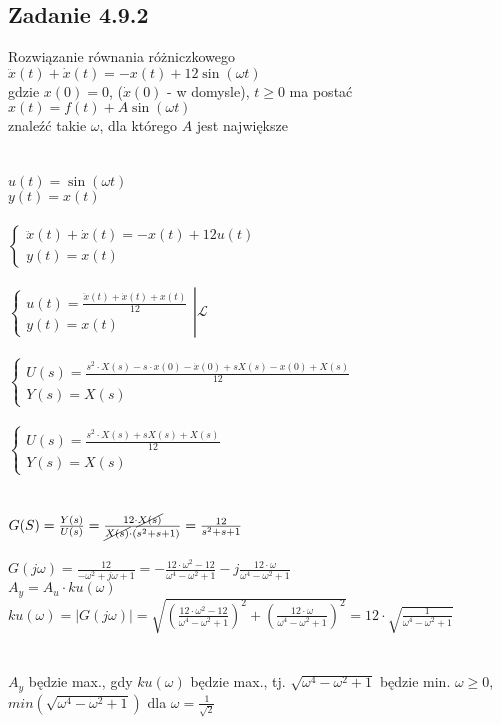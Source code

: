 \pagebreak
\subsection*{Zadanie 4.9.2} {\color{darkgray}
	Rozwiązanie równania różniczkowego\\
	$\ddot{x}(t)+\dot{x}(t)=-x(t)+12\sin({\omega t})$\\
	gdzie $x(0)=0$, ($\dot{x}(0)$ - w domysle), $t \geq 0$ ma postać\\
	$x(t)=f(t)+A\sin({\omega t})$\\
	znaleźć takie $\omega$, dla którego $A$ jest największe\\
}\lineh
\\\\
$u(t)=\sin({\omega t})$\\
$y(t)=x(t)$\\\\
$\begin{cases} \ddot{x}(t)+\dot{x}(t)=-x(t)+12u(t)\\y(t)=x(t)\end{cases}$\\\\
$\left.\begin{cases} u(t)=\frac{\ddot{x}(t)+\dot{x}(t)+x(t)}{12}\\y(t)=x(t)\end{cases}\right|\mathscr{L}$\\\\
$\begin{cases} U(s)=\frac{s^2\cdot X(s)-s\cdot x(0)-\dot{x}(0)+sX(s)-x(0)+X(s)}{12}\\Y(s)=X(s)\end{cases}$\\\\
$\begin{cases} U(s)=\frac{s^2\cdot X(s)+sX(s)+X(s)}{12}\\Y(s)=X(s)\end{cases}$\\\\\\
$G(S)=\frac{Y(s)}{U(s)}=\frac{12\cdot \cancel{X(s)}}{\cancel{X(s)}\cdot (s^2+s+1)}=\frac{12}{s^2+s+1}$\\\\
$G(j\omega)=\frac{12}{-\omega^2+j\omega+1}=-\frac{12\cdot \omega^2-12}{\omega^4-\omega^2+1}-j\frac{12\cdot \omega}{\omega^4-\omega^2+1}$\\
$A_y=A_u\cdot ku(\omega)$\\
$ku(\omega)=|G(j\omega)|=\sqrt{\left(\frac{12\cdot \omega^2-12}{\omega^4-\omega^2+1}\right)^2+\left(\frac{12\cdot \omega}{\omega^4-\omega^2+1}\right)^2}=12\cdot \sqrt{\frac{1}{\omega^4-\omega^2+1}}$\\\\\\
$A_y$ będzie max., gdy $ku(\omega)$ będzie max., tj. $\sqrt{\omega^4-\omega^2+1}$ będzie min.
$\omega \geq 0$, $min(\sqrt{\omega^4-\omega^2+1})$ dla $\omega=\frac{1}{\sqrt{2}}$


